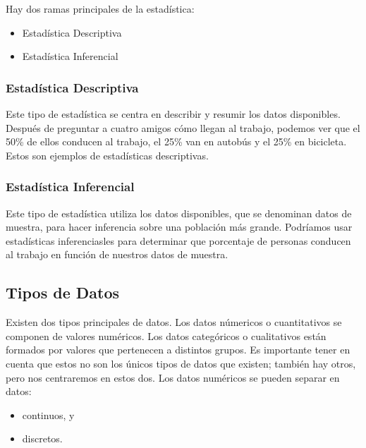 \documentclass[
  letterpaper,
  DIV=11,
  numbers=noendperiod]{scrreprt}
\begin{document}
Hay dos ramas principales de la estadística:

\begin{itemize}
\item
  Estadística Descriptiva
\item
  Estadística Inferencial
\end{itemize}

\hypertarget{estaduxedstica-descriptiva}{%
\subsubsection{Estadística
Descriptiva}\label{estaduxedstica-descriptiva}}

Este tipo de estadística se centra en describir y resumir los datos
disponibles. Después de preguntar a cuatro amigos cómo llegan al
trabajo, podemos ver que el 50\% de ellos conducen al trabajo, el 25\%
van en autobús y el 25\% en bicicleta. Estos son ejemplos de
estadísticas descriptivas.

\hypertarget{estaduxedstica-inferencial}{%
\subsubsection{Estadística
Inferencial}\label{estaduxedstica-inferencial}}

Este tipo de estadística utiliza los datos disponibles, que se denominan
datos de muestra, para hacer inferencia sobre una población más grande.
Podríamos usar estadísticas inferenciasles para determinar que
porcentaje de personas conducen al trabajo en función de nuestros datos
de muestra.

\hypertarget{tipos-de-datos}{%
\subsection{Tipos de Datos}\label{tipos-de-datos}}

Existen dos tipos principales de datos. Los datos númericos o
cuantitativos se componen de valores numéricos. Los datos categóricos o
cualitativos están formados por valores que pertenecen a distintos
grupos. Es importante tener en cuenta que estos no son los únicos tipos
de datos que existen; también hay otros, pero nos centraremos en estos
dos. Los datos numéricos se pueden separar en datos:

\begin{itemize}
\item
  continuos, y
\item
  discretos.
\end{itemize}
\end{document}
